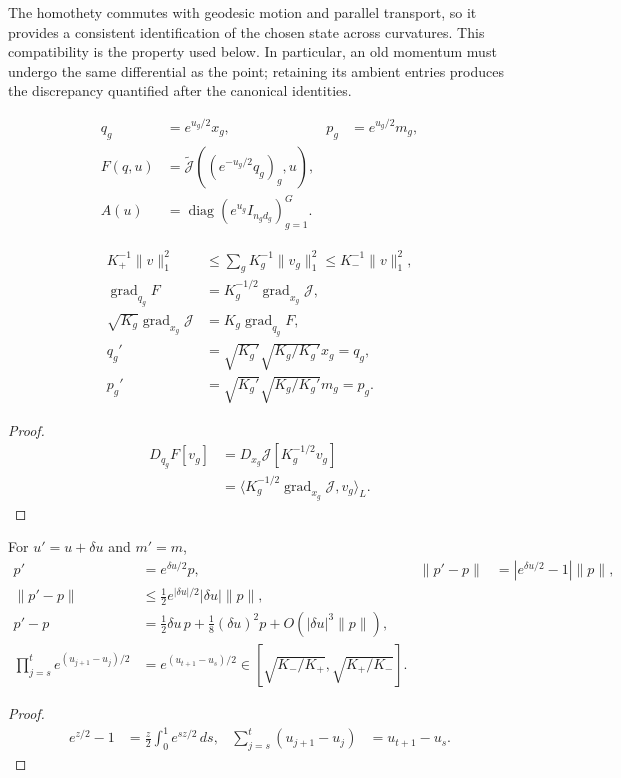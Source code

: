 The homothety commutes with geodesic motion and parallel transport, so it provides a consistent identification of the chosen state across curvatures. This compatibility is the property used below. In particular, an old momentum must undergo the same differential as the point; retaining its ambient entries produces the discrepancy quantified after the canonical identities.

\begin{definition}
\begin{align}\label{eq:canonical}
 q_g&=e^{u_g/2}x_g,&p_g&=e^{u_g/2}m_g,\\
 F(q,u)&=\widetilde{\mathcal J}((e^{-u_g/2}q_g)_g,u),\\
 A(u)&=\operatorname{diag}(e^{u_g}I_{n_gd_g})_{g=1}^G.
\end{align}
\end{definition}
\begin{corollary}
\label{cor:canonical-gradient}
\begin{align}\label{eq:equivalent-metrics}
 K_+^{-1}\|v\|_1^2&\le\sum_gK_g^{-1}\|v_g\|_1^2
 \le K_-^{-1}\|v\|_1^2,\\
 \operatorname{grad}_{q_g}F&=K_g^{-1/2}\operatorname{grad}_{x_g}\mathcal J,\\
 \sqrt{K_g}\operatorname{grad}_{x_g}\mathcal J
 &=K_g\operatorname{grad}_{q_g}F,\\
 q_g'&=\sqrt{K_g'}\sqrt{K_g/K_g'}x_g=q_g,\\
 p_g'&=\sqrt{K_g'}\sqrt{K_g/K_g'}m_g=p_g.
\end{align}
\end{corollary}
\begin{proof}
\begin{align}
 D_{q_g}F[v_g]
 &=D_{x_g}\mathcal J[K_g^{-1/2}v_g]\\
 &=\langle K_g^{-1/2}\operatorname{grad}_{x_g}\mathcal J,v_g\rangle_L.
\end{align}
\end{proof}

\begin{proposition}
\label{prop:omitted-rigid}
For $u'=u+\delta u$ and $m'=m$,
\begin{align}\label{eq:missing-transport}
 p'&=e^{\delta u/2}p,&
 \|p'-p\|&=|e^{\delta u/2}-1|\|p\|,\\
 \|p'-p\|&\le\tfrac12e^{|\delta u|/2}|\delta u|\|p\|,\\
 p'-p&=\tfrac12\delta u\,p+\tfrac18(\delta u)^2p+O(|\delta u|^3\|p\|),\\
 \prod_{j=s}^{t}e^{(u_{j+1}-u_j)/2}
 &=e^{(u_{t+1}-u_s)/2}\in[\sqrt{K_-/K_+},\sqrt{K_+/K_-}].
\end{align}
\end{proposition}
\begin{proof}
\begin{align}
 e^{z/2}-1&=\tfrac z2\int_0^1e^{sz/2}\,ds,&
 \sum_{j=s}^{t}(u_{j+1}-u_j)&=u_{t+1}-u_s.
\end{align}
\end{proof}

